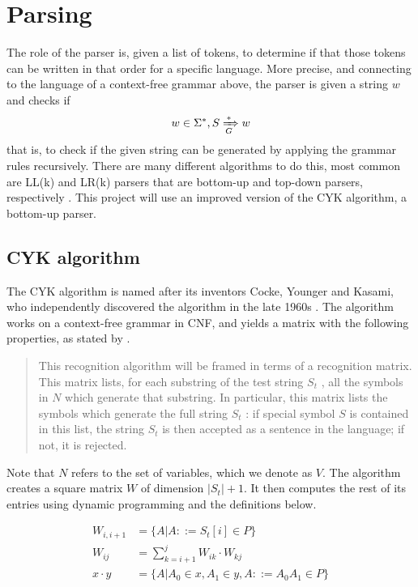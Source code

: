 \documentclass[a4paper,12pt,twosided]{report}
\renewcommand\cite{\citep}
\begin{document}
\section{Parsing}
\label{parsingsection}
The role of the parser is, given a list of tokens, to determine if that those
tokens can be written in that order for a specific language. More precise, and
connecting to the language of a context-free grammar above, the parser is given
a string $w$ and checks if 
\[
w \in \Sigma^*, S \xRightarrow[G]{*} w
\]
that is, to check if the given string can be generated by applying the grammar
rules recursively. There are many different algorithms to do this, most common
are LL(k) and LR(k) parsers that are bottom-up and top-down parsers,
respectively \cite[p.192]{dragonbook}. This project will use an improved version
of the CYK algorithm, a bottom-up parser.

\subsection{CYK algorithm}
The CYK algorithm is named after its inventors Cocke, Younger and Kasami, who
independently discovered the algorithm in the late 1960s \cite{Younger67}. The
algorithm works on a context-free grammar in CNF, and yields a matrix with the
following properties, as stated by \citet{Younger67}.

\begin{quote}
This recognition algorithm will be framed in terms of a recognition
matrix. This matrix lists, for each substring of the test string $S_t$ , all
the symbols in $N$ which generate that substring. In particular, this
matrix lists the symbols which generate the full string $S_t$ : if special
symbol $S$ is contained in this list, the string $S_t$ is then accepted as a
sentence in the language; if not, it is rejected.
\end{quote}

Note that $N$ refers to the set of variables, which we denote as $V$. The
algorithm creates a square matrix $W$ of dimension $|S_t|+1$.  It then computes
the rest of its entries using dynamic programming and the definitions below.

\begin{align}
W_{i,i+1} &= \{ A | A ::= S_t[i] \in P \} \\
W_{ij}    &= \sum_{k=i+1}^{j} W_{ik} \cdot W_{kj} \\
x \cdot y &= \{ A | A_0 \in x, A_1 \in y, A ::= A_0A_1 \in P \} \label{abc}
\end{align}
\end{document}
